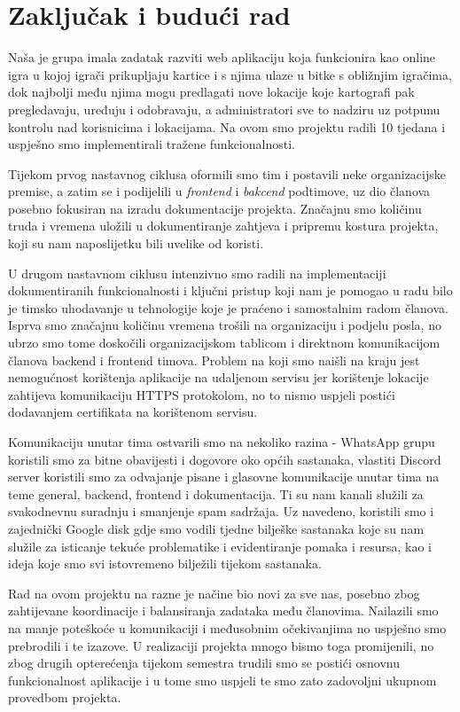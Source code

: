 \chapter{Zaključak i budući rad}
		 
		 Naša je grupa imala zadatak razviti web aplikaciju koja funkcionira kao online igra u kojoj igrači prikupljaju kartice i s njima ulaze u bitke s obližnjim igračima, dok najbolji među njima mogu predlagati nove lokacije koje kartografi pak pregledavaju, uređuju i odobravaju, a administratori sve to nadziru uz potpunu kontrolu nad korisnicima i lokacijama. Na ovom smo projektu radili 10 tjedana i uspješno smo implementirali tražene funkcionalnosti.

        Tijekom prvog nastavnog ciklusa oformili smo tim i postavili neke organizacijske premise, a zatim se i podijelili u  \textit{frontend} i \textit{bakcend} podtimove, uz dio članova posebno fokusiran na izradu dokumentacije projekta. Značajnu smo količinu truda i vremena uložili u dokumentiranje zahtjeva i pripremu kostura projekta, koji su nam naposlijetku bili uvelike od koristi.

        U drugom nastavnom ciklusu intenzivno smo radili na implementaciji dokumentiranih funkcionalnosti i ključni pristup koji nam je pomogao u radu bilo je timsko uhodavanje u tehnologije koje je praćeno i samostalnim radom članova. Isprva smo značajnu količinu vremena trošili na organizaciju i podjelu posla, no ubrzo smo tome doskočili organizacijskom tablicom i direktnom komunikacijom članova backend i frontend timova. Problem na koji smo naišli na kraju jest nemogućnost korištenja aplikacije na udaljenom servisu jer korištenje lokacije zahtijeva komunikaciju HTTPS protokolom, no to nismo uspjeli postići dodavanjem certifikata na korištenom servisu.

        Komunikaciju unutar tima ostvarili smo na nekoliko razina -  WhatsApp grupu koristili smo za bitne obavijesti i dogovore oko općih sastanaka, vlastiti Discord server koristili smo za odvajanje pisane i glasovne komunikacije unutar tima na teme general, backend, frontend i dokumentacija. Ti su nam kanali služili za svakodnevnu suradnju i smanjenje spam sadržaja. Uz navedeno, koristili smo i zajednički Google disk gdje smo vodili tjedne bilješke sastanaka koje su nam služile za isticanje tekuće problematike i evidentiranje pomaka i resursa, kao i ideja koje smo svi istovremeno bilježili tijekom sastanaka.

        Rad na ovom projektu na razne je načine bio novi za sve nas, posebno zbog zahtijevane koordinacije i balansiranja zadataka među članovima. Nailazili smo na manje poteškoće u komunikaciji i međusobnim očekivanjima no uspješno smo prebrodili i te izazove. U realizaciji projekta mnogo bismo toga promijenili, no zbog drugih opterećenja tijekom semestra trudili smo se postići osnovnu funkcionalnost aplikacije i u tome smo uspjeli te smo zato zadovoljni ukupnom provedbom projekta.
		
		\eject 